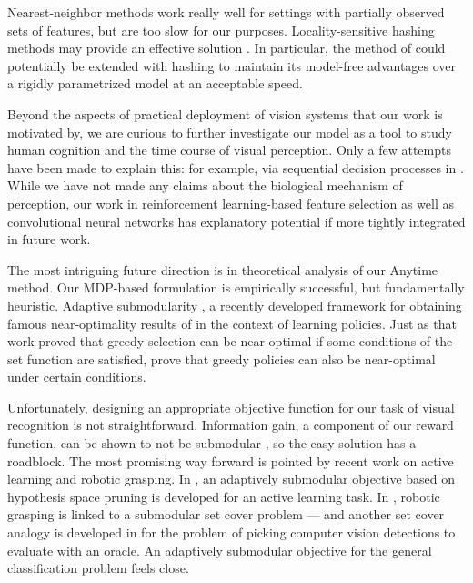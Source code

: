 Nearest-neighbor methods work really well for settings with partially observed sets of features, but are too slow for our purposes.
Locality-sensitive hashing methods may provide an effective solution \parencite{Kulis2009b}.
In particular, the method of \cite{Gao-NIPS-2011} could potentially be extended with hashing to maintain its model-free advantages over a rigidly parametrized model at an acceptable speed.

Beyond the aspects of practical deployment of vision systems that our work is motivated by, we are curious to further investigate our model as a tool to study human cognition and the time course of visual perception.
Only a few attempts have been made to explain this: for example, via sequential decision processes in \textcite{Hegde-Neuro-2008}.
While we have not made any claims about the biological mechanism of perception, our work in reinforcement learning-based feature selection as well as convolutional neural networks has explanatory potential if more tightly integrated in future work.

The most intriguing future direction is in theoretical analysis of our Anytime method.
Our MDP-based formulation is empirically successful, but fundamentally heuristic.
Adaptive submodularity \parencite{Golovin-and-Krause-2010-JAIR}, a recently developed framework for obtaining famous near-optimality results of \cite{Nemhauser1978} in the context of learning policies.
Just as that work proved that greedy selection can be near-optimal if some conditions of the set function are satisfied, \cite{Golovin-and-Krause-2010-JAIR} prove that greedy policies can also be near-optimal under certain conditions.

Unfortunately, designing an appropriate objective function for our task of visual recognition is not straightforward.
Information gain, a component of our reward function, can be shown to not be submodular \cite{Krause-UAI-2005}, so the easy solution has a roadblock.
The most promising way forward is pointed by recent work on active learning and robotic grasping.
In \cite{Golovin-2010}, an adaptively submodular objective based on hypothesis space pruning is developed for an active learning task.
In \cite{Javdani2012}, robotic grasping is linked to a submodular set cover problem --- and another set cover analogy is developed in \cite{Chen-2014-ICML} for the problem of picking computer vision detections to evaluate with an oracle.
An adaptively submodular objective for the general classification problem feels close.

